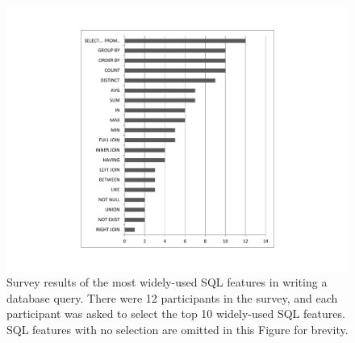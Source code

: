 
\begin{figure}[t]
  \centering
  \includegraphics[scale=0.50]{survey}
  \vspace*{-3.0ex}\caption {{\label{fig:survey}
  Survey results of the most widely-used SQL features
  in writing a database query. There were 12 participants
  in the survey, and each participant was asked to
  select the top 10 widely-used SQL features.
  SQL features with no selection are omitted in this Figure
  for brevity.
}}
\end{figure}

\newcommand{\q}{\langle query\rangle}
\newcommand{\db}{\langle db\rangle}
\newcommand{\pat}{\langle pat\rangle}
\newcommand{\bug}{\langle bug\rangle}
\newcommand{\dist}{\langle distance\rangle}
\newcommand{\sem}[1]{\llbracket #1\rrbracket}
\newcommand{\lit}[1]{\texttt{#1}}

\newcommand{\column}{\langle column\rangle}
\newcommand{\dbtable}{\langle table\rangle}
\newcommand{\cond}{\langle cond\rangle}
\newcommand{\op}{\langle op\rangle}
\newcommand{\e}{\langle expr\rangle}
\newcommand{\ce}{\langle cexpr\rangle}

